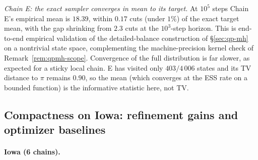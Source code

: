 \documentclass[11pt]{article}
\begin{document}
\emph{Chain E: the exact sampler converges in mean to its target.} At
$10^5$ steps Chain E's empirical mean is $18.39$, within $0.17$ cuts
(under $1\%$) of the exact target mean, with the gap shrinking from
$2.3$ cuts at the $10^3$-step horizon. This is end-to-end empirical
validation of the detailed-balance construction of \S\ref{sec:qp-mh}
on a nontrivial state space, complementing the machine-precision
kernel check of Remark~\ref{rem:qpmh-scope}. Convergence of the full
distribution is far slower, as expected for a sticky local chain. E
has visited only $403/4\,006$ states and its TV distance to $\pi$
remains $0.90$, so the mean (which converges at the ESS rate on a
bounded function) is the informative statistic here, not TV.

\subsection{Compactness on Iowa: refinement gains and optimizer baselines}\label{sec:exp-compactness}

\paragraph{Iowa (6 chains).}\label{sec:exp-iowa}
\end{document}
